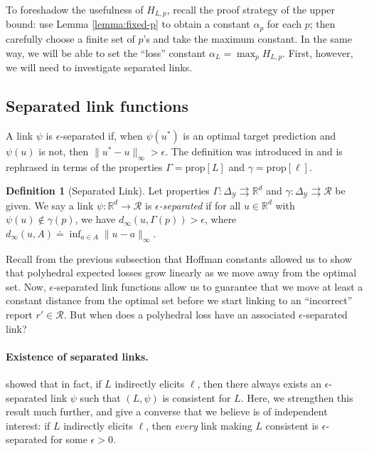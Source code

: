 \documentclass{article}
\theoremstyle{definition}\newtheorem{definition}{Definition}
\theoremstyle{definition}\newtheorem{assumption}{Assumption}
\newcommand{\reals}{\mathbb{R}}
\newcommand{\defeq}{\doteq}%
\newcommand{\prop}[1]{\mathrm{prop}[#1]}
\newcommand{\simplex}{\Delta_\Y}
\newcommand{\R}{\mathcal{R}}
\newcommand{\Y}{\mathcal{Y}}
\newcommand{\toto}{\rightrightarrows}
\begin{document}
To foreshadow the usefulness of $H_{L,p}$, recall the proof strategy of the upper bound: use Lemma \ref{lemma:fixed-p} to obtain a constant $\alpha_p$ for each $p$; then carefully choose a finite set of $p$'s and take the maximum constant.
In the same way, we will be able to set the ``loss'' constant $\alpha_L = \max_p H_{L,p}$.
First, however, we will need to investigate separated links.

\subsection{Separated link functions}
A link $\psi$ is $\epsilon$-separated if, when $\psi(u^*)$ is an optimal target prediction and $\psi(u)$ is not, then $\|u^* - u\|_{\infty} > \epsilon$.
The definition was introduced in \cite{finocchiaro2020embedding} and is rephrased in terms of the properties $\Gamma = \prop{L}$ and $\gamma = \prop{\ell}$.

\begin{definition}[Separated Link]\label{def:sep-link}
  Let properties $\Gamma:\simplex\toto\reals^d$ and $\gamma:\simplex\toto\R$ be given.
  We say a link $\psi:\reals^d\to\R$
  is \emph{$\epsilon$-separated} if for all $u\in\reals^d$ with $\psi(u)\notin\gamma(p)$, we have $d_\infty(u,\Gamma(p)) > \epsilon$, where $d_\infty(u,A) \defeq \inf_{a\in A} \|u-a\|_\infty$.
\end{definition}

Recall from the previous subsection that Hoffman constants allowed us to show that polyhedral expected losses grow linearly as we move away from the optimal set.
Now, $\epsilon$-separated link functions allow us to guarantee that we move at least a constant distance from the optimal set before we start linking to an ``incorrect'' report $r' \in \R$.
But when does a polyhedral loss have an associated $\epsilon$-separated link?

\paragraph{Existence of separated links.}
\cite{finocchiaro2020embedding} showed that in fact, if $L$ indirectly elicits $\ell$, then there always exists an $\epsilon$-separated link $\psi$ such that $(L,\psi)$ is consistent for $L$.
Here, we strengthen this result much further, and give a converse that we believe is of independent interest: if $L$ indirectly elicits $\ell$, then \emph{every} link making $L$ consistent is $\epsilon$-separated for some $\epsilon > 0$.
\end{document}
